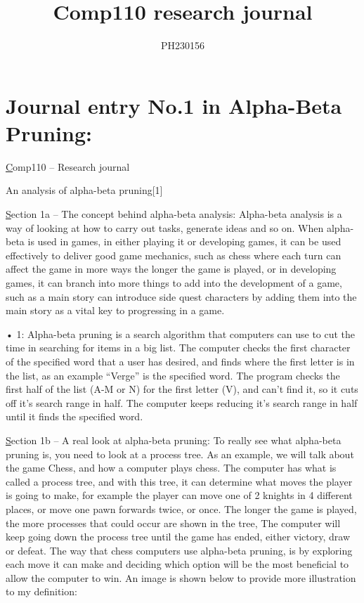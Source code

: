 \documentclass{article}
\title{Comp110 research journal}
\author{PH230156}
\begin{document}
\maketitle

\section{Journal entry No.1 in Alpha-Beta Pruning:}

\underline Comp110 – Research journal
\par An analysis of alpha-beta pruning[1]
\par \underline Section 1a – The concept behind alpha-beta analysis:
Alpha-beta analysis is a way of looking at how to carry out tasks, generate ideas and so on. When alpha-beta is used in games, in either playing it or developing games, it can be used effectively to deliver good game mechanics, such as chess where each turn can affect the game in more ways the longer the game is played, or in developing games, it can branch into more things to add into the development of a game, such as a main story can introduce side quest characters by adding them into the main story as a vital key to progressing in a game.

\par
•	1: Alpha-beta pruning is a search algorithm that computers can use to cut the time in searching for items in a big list. The computer checks the first character of the specified word that a user has desired, and finds where the first letter is in the list, as an example “Verge” is the specified word. The program checks the first half of the list (A-M or N) for the first letter (V), and can’t find it, so it cuts off it’s search range in half. The computer keeps reducing it’s search range in half until it finds the specified word.
\par
\underline Section 1b – A real look at alpha-beta pruning:
To really see what alpha-beta pruning is, you need to look at a process tree. As an example, we will talk about the game Chess, and how a computer plays chess. The computer has what is called a process tree, and with this tree, it can determine what moves the player is going to make, for example the player can move one of 2 knights in 4 different places, or move one pawn forwards twice, or once. The longer the game is played, the more processes that could occur are shown in the tree, The computer will keep going down the process tree until the game has ended, either victory, draw or defeat. The way that chess computers use alpha-beta pruning, is by exploring each move it can make and deciding which option will be the most beneficial to allow the computer to win.
An image is shown below to provide more illustration to my definition:
\end{document}
